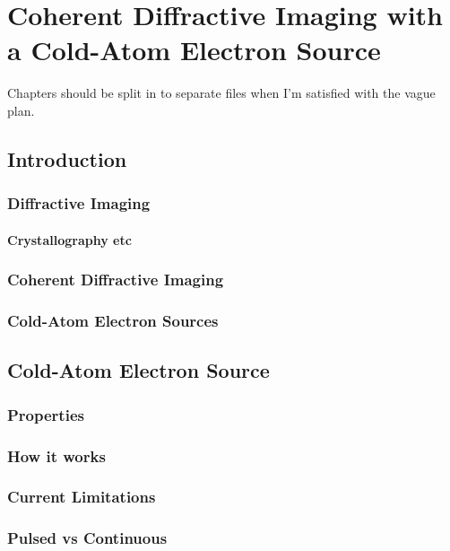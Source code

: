 \part{Coherent Diffractive Imaging with a Cold-Atom Electron Source}

Chapters should be split in to separate files when I'm satisfied with the vague plan.

\chapter{Introduction}

\section{Diffractive Imaging}

\subsection{Crystallography etc}

\section{Coherent Diffractive Imaging}

\section{Cold-Atom Electron Sources}




\chapter{Cold-Atom Electron Source}\label{chapter:setup}

\section{Properties}

\section{How it works}

\section{Current Limitations}

\section{Pulsed vs Continuous}

